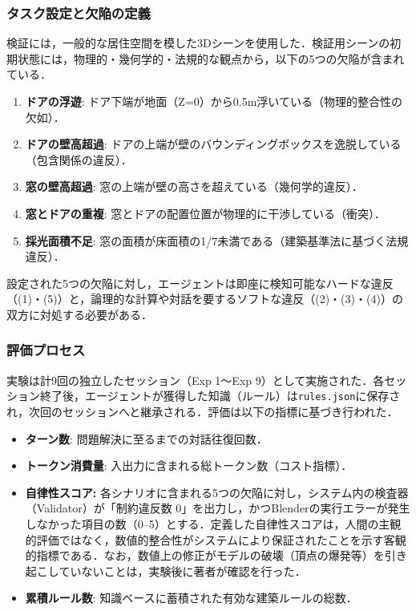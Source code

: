 \documentclass[dvipdfmx, a4paper, 9pt]{deimj}
\begin{document}
\subsubsection{タスク設定と欠陥の定義}

検証には，一般的な居住空間を模した3Dシーンを使用した．検証用シーンの初期状態には，物理的・幾何学的・法規的な観点から，以下の5つの欠陥が含まれている．

\begin{enumerate}
  \item \textbf{ドアの浮遊}: ドア下端が地面（Z=0）から0.5m浮いている（物理的整合性の欠如）．
  \item \textbf{ドアの壁高超過}: ドアの上端が壁のバウンディングボックスを逸脱している（包含関係の違反）．
  \item \textbf{窓の壁高超過}: 窓の上端が壁の高さを超えている（幾何学的違反）．
  \item \textbf{窓とドアの重複}: 窓とドアの配置位置が物理的に干渉している（衝突）．
  \item \textbf{採光面積不足}: 窓の面積が床面積の1/7未満である（建築基準法に基づく法規違反）．
\end{enumerate}

設定された5つの欠陥に対し，エージェントは即座に検知可能なハードな違反（(1)・(5)）と，論理的な計算や対話を要するソフトな違反（(2)・(3)・(4)）の双方に対処する必要がある．

\subsubsection{評価プロセス}

実験は計9回の独立したセッション（Exp 1〜Exp 9）として実施された．各セッション終了後，エージェントが獲得した知識（ルール）は\texttt{rules.json}に保存され，次回のセッションへと継承される．評価は以下の指標に基づき行われた．

\begin{itemize}
    \item \textbf{ターン数}: 問題解決に至るまでの対話往復回数．
    \item \textbf{トークン消費量}: 入出力に含まれる総トークン数（コスト指標）．
    \item \textbf{自律性スコア:} 
    各シナリオに含まれる5つの欠陥に対し，システム内の検査器（Validator）が「制約違反数 0」を出力し，かつBlenderの実行エラーが発生しなかった項目の数（0--5）とする．定義した自律性スコアは，人間の主観的評価ではなく，数値的整合性がシステムにより保証されたことを示す客観的指標である．なお，数値上の修正がモデルの破壊（頂点の爆発等）を引き起こしていないことは，実験後に著者が確認を行った．
    \item \textbf{累積ルール数}: 知識ベースに蓄積された有効な建築ルールの総数．
\end{itemize}
\end{document}

